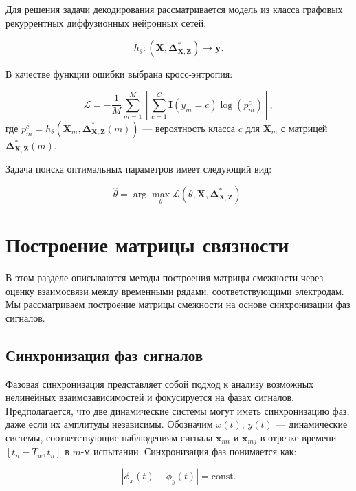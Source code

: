 \documentclass[12pt, twoside]{article}
\begin{document}
Для решения задачи декодирования рассматривается модель из класса графовых рекуррентных диффузионных нейронных сетей:

\begin{equation}
    h_\theta : (\mathbf{X}, \mathbf{\Delta}_{\mathbf{X},\mathbf{Z}}^*) \to \mathbf{y}.
\end{equation}

В качестве функции ошибки выбрана кросс-энтропия:

\begin{equation}
    \mathcal{L} = -\frac{1}{M} \sum_{m=1}^M \left[ \sum_{c=1}^C \mathbf{I}(y_m = c) \log(p_m^c) \right],
\end{equation}
где $p_m^c = h_\theta \left( \mathbf{X}_m, \mathbf{\Delta}_{\mathbf{X},\mathbf{Z}}^*(m) \right)$ — вероятность класса $c$ для $\mathbf{X}_m$ с матрицей $\mathbf{\Delta}_{\mathbf{X},\mathbf{Z}}^*(m)$.

Задача поиска оптимальных параметров имеет следующий вид:

\begin{equation}
    \hat{\theta} = \arg \max_{\theta} \mathcal{L}(\theta, \mathbf{X}, \mathbf{\Delta}_{\mathbf{X},\mathbf{Z}}^*).
\end{equation}

\section{Построение матрицы связности}

В этом разделе описываются методы построения матрицы смежности через оценку взаимосвязи между временными рядами, соответствующими электродам. Мы рассматриваем построение матрицы смежности на основе синхронизации фаз сигналов.

\subsection{Синхронизация фаз сигналов}

Фазовая синхронизация представляет собой подход к анализу возможных нелинейных взаимозависимостей и фокусируется на фазах сигналов. Предполагается, что две динамические системы могут иметь синхронизацию фаз, даже если их амплитуды независимы. Обозначим $x(t)$, $y(t)$ — динамические системы, соответствующие наблюдениям сигнала $\mathbf{x}_{mi}$ и $\mathbf{x}_{mj}$ в отрезке времени $[t_n - T_w, t_n]$ в $m$-м испытании. Синхронизация фаз понимается как:

\begin{equation}
|\phi_x(t) - \phi_y(t)| = \text{const}.
\end{equation}
\end{document}
